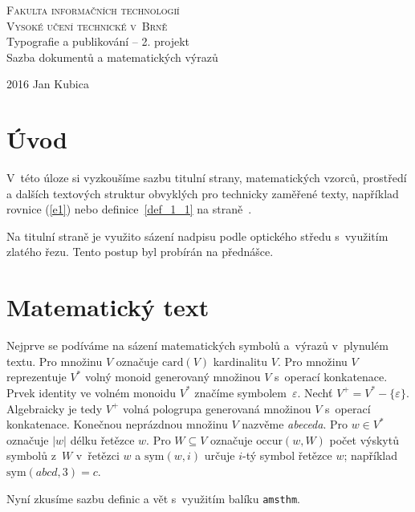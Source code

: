 \documentclass[11pt, a4paper]{article}
\date{}
\author{Jan Kubica}
\theoremstyle{definition}
\theoremstyle{plain}
\begin{document}
\begin{titlepage}

\begin{center}
\thispagestyle{empty}
{\baselineskip=17pt
{\Huge{\textsc{Fakulta informačních technologií \\ 
Vysoké učení technické v~Brně}}} \\
{\LARGE Typografie a publikování -- 2. projekt\\Sazba dokumentů a matematických výrazů}}
\end{center}
\Large{2016} \hfill \Large{Jan Kubica}

\end{titlepage}

\begin{twocolumn}

\section*{Úvod}
V~této úloze si vyzkoušíme sazbu titulní strany, matematických vzorců, prostředí a dalších textových struktur obvyklých pro technicky zaměřené texty, například rovnice (\ref{e1}) nebo definice~\ref{def_1_1} na straně~\pageref{def_1_1}.

Na titulní straně je využito sázení nadpisu podle optického středu s~využitím zlatého řezu. Tento postup byl probírán na přednášce.


\section{Matematický text}
Nejprve se podíváme na sázení matematických symbolů a~výrazů v~plynulém textu. Pro množinu $V$ označuje \linebreak $\textrm{card}(V)$ kardinalitu $V$.
Pro množinu $V$ reprezentuje $V^*$ volný monoid generovaný množinou $V$ s~operací konkatenace.
Prvek identity ve volném monoidu $V^*$ značíme symbolem~$\varepsilon$.
Nechť $V^+=V^* - \{\varepsilon\}$. Algebraicky je tedy $V^+$ volná pologrupa generovaná množinou $V$ s~operací konkatenace.
Konečnou neprázdnou množinu $V$ nazvěme \emph{abeceda}. 
Pro $w \in V^*$ označuje $|w|$ délku řetězce $w$. Pro $W \subseteq V$ označuje $\textrm{occur}(w,W)$ počet výskytů symbolů z~$W$ v~řetězci $w$ a $\textrm{sym}(w,i)$ určuje $i$-tý symbol řetězce $w$; například $\textrm{sym}(abcd,3)=c$.

Nyní zkusíme sazbu definic a vět s~využitím balíku \texttt{amsthm}.


\end{twocolumn}
\end{document}

